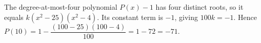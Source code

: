 The degree-at-most-four polynomial $P(x)-1$ has four distinct roots, so it equals $k(x^2-25)(x^2-4)$. Its constant term is $-1$, giving $100k=-1$. Hence $P(10)=1-\dfrac{(100-25)(100-4)}{100}=1-72=\boxed{-71}$.
